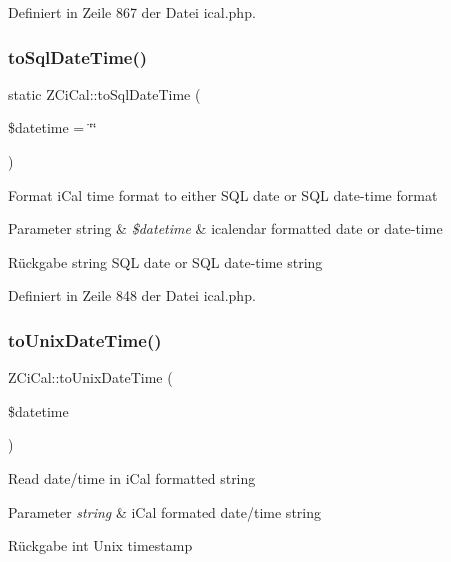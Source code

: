 Definiert in Zeile 867 der Datei ical.\+php.

\mbox{\label{class_z_ci_cal_a14cab50872568db88b1d132a6dab73e6}} 
\subsubsection{\texorpdfstring{to\+Sql\+Date\+Time()}{toSqlDateTime()}}
{\footnotesize\ttfamily static Z\+Ci\+Cal\+::to\+Sql\+Date\+Time (\begin{DoxyParamCaption}\item[{}]{\$datetime = {\ttfamily \char`\"{}\char`\"{}} }\end{DoxyParamCaption})\hspace{0.3cm}{\ttfamily [static]}}

Format i\+Cal time format to either S\+QL date or S\+QL date-\/time format


\begin{DoxyParams}[1]{Parameter}
string & {\em \$datetime} & icalendar formatted date or date-\/time\\
\hline
\end{DoxyParams}
\begin{DoxyReturn}{Rückgabe}
string S\+QL date or S\+QL date-\/time string 
\end{DoxyReturn}


Definiert in Zeile 848 der Datei ical.\+php.

\mbox{\label{class_z_ci_cal_ae50256ea2ae21dbfca3f22e92f78d753}} 
\subsubsection{\texorpdfstring{to\+Unix\+Date\+Time()}{toUnixDateTime()}}
{\footnotesize\ttfamily Z\+Ci\+Cal\+::to\+Unix\+Date\+Time (\begin{DoxyParamCaption}\item[{}]{\$datetime }\end{DoxyParamCaption})}

Read date/time in i\+Cal formatted string


\begin{DoxyParams}{Parameter}
{\em string} & i\+Cal formated date/time string\\
\hline
\end{DoxyParams}
\begin{DoxyReturn}{Rückgabe}
int Unix timestamp 
\end{DoxyReturn}


